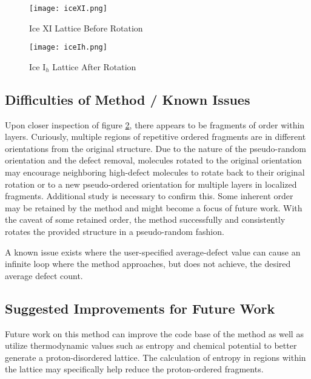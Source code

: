 \begin{figure}
	
	\centering
	
	\texttt{[image: iceXI.png]}
	
	\caption{Ice XI Lattice Before Rotation}
	
	\label{fig:iceXI}
	
\end{figure}

\begin{figure}
	
	\centering
	
	\texttt{[image: iceIh.png]}
	
	\caption{Ice I$_{h}$ Lattice After Rotation}
	
	\label{fig:iceIh}
	
\end{figure}


\subsection{Difficulties of Method / Known Issues}
Upon closer inspection of figure \ref{fig:iceIh}, there appears to be fragments of order within layers. 
Curiously, multiple regions of repetitive ordered fragments are in different orientations from the original structure. 
Due to the nature of the pseudo-random orientation and the defect removal, molecules rotated to the original orientation may encourage neighboring high-defect molecules to rotate back to their original rotation or to a new pseudo-ordered orientation for multiple layers in localized fragments. 
Additional study is necessary to confirm this. 
Some inherent order may be retained by the method and might become a focus of future work. 
With the caveat of some retained order, the method successfully and consistently rotates the provided structure in a pseudo-random fashion.

A known issue exists where the user-specified average-defect value can cause an infinite loop where the method approaches, but does not achieve, the desired average defect count.
\subsection{Suggested Improvements for Future Work}
Future work on this method can improve the code base of the method as well as utilize thermodynamic values such as entropy and chemical potential to better generate a proton-disordered lattice. 
The calculation of entropy in regions within the lattice may specifically help reduce the proton-ordered fragments.







